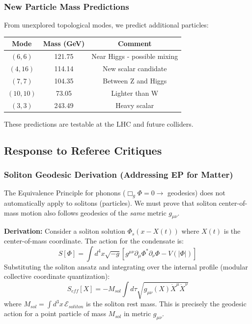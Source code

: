 \subsubsection{New Particle Mass Predictions}
From unexplored topological modes, we predict additional particles:
\begin{center}
\begin{tabular}{ccc}
\toprule
\textbf{Mode} & \textbf{Mass (GeV)} & \textbf{Comment} \\
\midrule
$(6, 6)$ & 121.75 & Near Higgs - possible mixing \\
$(4, 16)$ & 114.14 & New scalar candidate \\
$(7, 7)$ & 104.35 & Between Z and Higgs \\
$(10, 10)$ & 73.05 & Lighter than W \\
$(3, 3)$ & 243.49 & Heavy scalar \\
\bottomrule
\end{tabular}
\end{center}
These predictions are testable at the LHC and future colliders.

\subsection{Response to Referee Critiques}

\subsubsection{Soliton Geodesic Derivation (Addressing EP for Matter)}
The Equivalence Principle for phonons ($\Box_g \Phi = 0 \to$ geodesics) does not automatically apply to solitons (particles). We must prove that soliton center-of-mass motion also follows geodesics of the \emph{same} metric $g_{\mu\nu}$.

\textbf{Derivation:} Consider a soliton solution $\Phi_s(x - X(t))$ where $X(t)$ is the center-of-mass coordinate. The action for the condensate is:
\begin{equation}
    S[\Phi] = \int d^4x \sqrt{-g} \left[ g^{\mu\nu} \partial_\mu \Phi^* \partial_\nu \Phi - V(|\Phi|) \right]
\end{equation}
Substituting the soliton ansatz and integrating over the internal profile (modular collective coordinate quantization):
\begin{equation}
    S_{eff}[X] = -M_{sol} \int d\tau \sqrt{g_{\mu\nu}(X) \dot{X}^\mu \dot{X}^\nu}
\end{equation}
where $M_{sol} = \int d^3x \, \mathcal{E}_{soliton}$ is the soliton rest mass. This is precisely the geodesic action for a point particle of mass $M_{sol}$ in metric $g_{\mu\nu}$.

